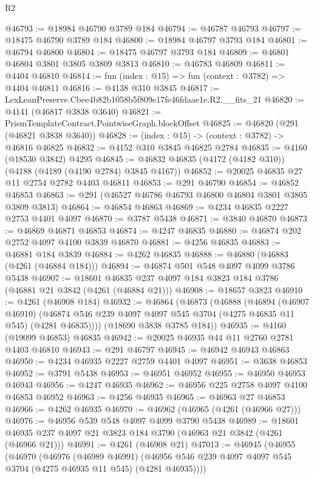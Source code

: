 \begin{lexlean}{R2}
\begin{coremodule}
@46793 := @18984 @46790 @3789 @184
@46794 := @46787 @46793
@46797 := @18475 @46790 @3789 @184
@46800 := @18984 @46797 @3793 @184
@46801 := @46794 @46800
@46804 := @18475 @46797 @3793 @184
@46809 := @46801 @46804 @3801 @3805 @3809 @3813
@46810 := @46783 @46809
@46811 := @4404 @46810
@46814 := fun (index : @15) => fun (context : @3782) => @4404 @46811
@46816 := @4138 @310 @3845
@46817 := LexLeanPreserve.Cbee4b82b1058b5f809e17fe46fdaae1e.R2.__fits_21
@46820 := @4141 (@46817 @3838 @3640)
@46821 := PrismTemplateContract.PointwiseGraph.blockOffset
@46825 := @46820 (@291 (@46821 @3838 @3640))
@46828 := (index : @15) -> (context : @3782) -> @46816 @46825
@46832 := @4152 @310 @3845 @46825 @2784
@46835 := @4160 (@18530 @3842) @4295
@46845 := @46832 @46835 (@4172 (@4182 @310)) (@4188 (@4189 (@4190 @2784) @3845 @4167))
@46852 := @20025 @46835 @27 @11 @2754 @2782 @4403 @46811
@46853 := @291 @46790
@46854 := @46852 @46853
@46863 := @291 (@46527 @46786 @46793 @46800 @46804 @3801 @3805 @3809 @3813)
@46864 := @46854 @46863
@46869 := @4234 @46835 @2227 @2753 @4401 @4097
@46870 := @3787 @5438
@46871 := @3840 @46870
@46873 := @46869 @46871 @46853
@46874 := @4247 @46835
@46880 := @46874 @202 @2752 @4097 @4100 @3839 @46870
@46881 := @4256 @46835
@46883 := @46881 @184 @3839
@46884 := @4262 @46835
@46888 := @46880 (@46883 (@4261 (@46884 @184)))
@46894 := @46874 @501 @548 @4097 @4099 @3786 @5438
@46907 := @18601 @46835 @237 @4097 @184 @3823 @184 @3786 (@46881 @21 @3842 (@4261 (@46884 @21)))
@46908 := @18657 @3823
@46910 := @4261 (@46908 @184)
@46932 := @46864
    (@46873
      (@46888
        (@46894
          (@46907 @46910)
          (@46874 @546 @239 @4097 @4097 @545 @3704 (@4275 @46835 @11 @545) (@4281 @46835))))
      (@18690 @3838 @3785 @184))
@46935 := @4160 (@19099 @46853) @46835
@46942 := @20025 @46935 @44 @11 @2760 @2781 @4403 @46810
@46943 := @291 @46797
@46945 := @46942 @46943 @46863
@46950 := @4234 @46935 @2227 @2759 @4401 @4097
@46951 := @3638 @46853
@46952 := @3791 @5438
@46953 := @46951 @46952
@46955 := @46950 @46953 @46943
@46956 := @4247 @46935
@46962 := @46956 @225 @2758 @4097 @4100 @46853 @46952
@46963 := @4256 @46935
@46965 := @46963 @27 @46853
@46966 := @4262 @46935
@46970 := @46962 (@46965 (@4261 (@46966 @27)))
@46976 := @46956 @539 @548 @4097 @4099 @3790 @5438
@46989 := @18601 @46935 @237 @4097 @21 @3823 @184 @3790 (@46963 @21 @3842 (@4261 (@46966 @21)))
@46991 := @4261 (@46908 @21)
@47013 := @46945
    (@46955
      (@46970
        (@46976
          (@46989 @46991)
          (@46956 @546 @239 @4097 @4097 @545 @3704 (@4275 @46935 @11 @545) (@4281 @46935))))

\end{coremodule}
\end{lexlean}
